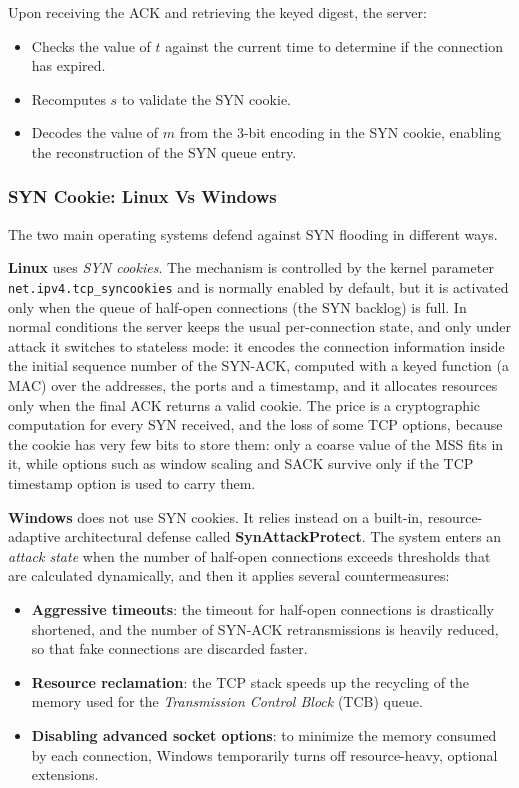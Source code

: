 Upon receiving the ACK and retrieving the keyed digest, the server:

\begin{itemize}
	\item Checks the value of $t$ against the current time to determine if the connection has expired.
	\item Recomputes $s$ to validate the SYN cookie.
	\item Decodes the value of $m$ from the 3-bit encoding in the SYN cookie, enabling the reconstruction of the SYN queue entry.
\end{itemize}

\subsubsection{SYN Cookie: Linux Vs Windows}
The two main operating systems defend against SYN flooding in different ways.

\textbf{Linux} uses \textit{SYN cookies}. The mechanism is controlled by the kernel parameter \texttt{net.ipv4.tcp\_syncookies} and is normally enabled by default, but it is activated only when the queue of half-open connections (the SYN backlog) is full. In normal conditions the server keeps the usual per-connection state, and only under attack it switches to stateless mode: it encodes the connection information inside the initial sequence number of the SYN-ACK, computed with a keyed function (a MAC) over the addresses, the ports and a timestamp, and it allocates resources only when the final ACK returns a valid cookie. The price is a cryptographic computation for every SYN received, and the loss of some TCP options, because the cookie has very few bits to store them: only a coarse value of the MSS fits in it, while options such as window scaling and SACK survive only if the TCP timestamp option is used to carry them.

\textbf{Windows} does not use SYN cookies. It relies instead on a built-in, resource-adaptive architectural defense called \textbf{SynAttackProtect}. The system enters an \textit{attack state} when the number of half-open connections exceeds thresholds that are calculated dynamically, and then it applies several countermeasures:
\begin{itemize}
	\item \textbf{Aggressive timeouts}: the timeout for half-open connections is drastically shortened, and the number of SYN-ACK retransmissions is heavily reduced, so that fake connections are discarded faster.
	\item \textbf{Resource reclamation}: the TCP stack speeds up the recycling of the memory used for the \textit{Transmission Control Block} (TCB) queue.
	\item \textbf{Disabling advanced socket options}: to minimize the memory consumed by each connection, Windows temporarily turns off resource-heavy, optional extensions.
\end{itemize}

